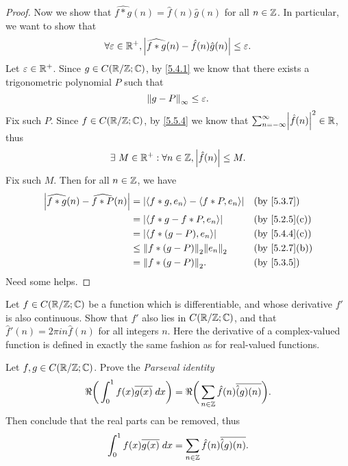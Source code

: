 \begin{proof}
  Now we show that \(\widehat{f * g}(n) = \hat{f}(n) \hat{g}(n)\) for all \(n \in \Z\).
  In particular, we want to show that
  \[
    \forall \varepsilon \in \R^+, \abs{\widehat{f * g}(n) - \hat{f}(n) \hat{g}(n)} \leq \varepsilon.
  \]
  Let \(\varepsilon \in \R^+\).
  Since \(g \in C(\R / \Z ; \C)\), by \cref{5.4.1} we know that there exists a trigonometric polynomial \(P\) such that
  \[
    \norm*{g - P}_{\infty} \leq \varepsilon.
  \]
  Fix such \(P\).
  Since \(f \in C(\R / \Z ; \C)\), by \cref{5.5.4} we know that \(\sum_{n = -\infty}^\infty \abs{\hat{f}(n)}^2 \in \R\), thus
  \[
    \exists\ M \in \R^+ : \forall n \in \Z, \abs{\hat{f}(n)} \leq M.
  \]
  Fix such \(M\).
  Then for all \(n \in \Z\), we have
  \begin{align*}
    \abs{\widehat{f * g}(n) - \widehat{f * P}(n)} & = \abs{\inner*{f * g, e_n} - \inner*{f * P, e_n}} &  & \text{(by \cref{5.3.7})}    \\
                                                  & = \abs{\inner*{f * g - f * P, e_n}}               &  & \text{(by \cref{5.2.5}(c))} \\
                                                  & = \abs{\inner*{f * (g - P), e_n}}                 &  & \text{(by \cref{5.4.4}(c))} \\
                                                  & \leq \norm*{f * (g - P)}_2 \norm*{e_n}_2          &  & \text{(by \cref{5.2.7}(b))} \\
                                                  & = \norm*{f * (g - P)}_2.                          &  & \text{(by \cref{5.3.5})}
  \end{align*}
  Need some helps.
\end{proof}

\begin{ex}\label{ex:5.5.4}
  Let \(f \in C(\R / \Z ; \C)\) be a function which is differentiable, and whose derivative \(f'\) is also continuous.
  Show that \(f'\) also lies in \(C(\R / \Z ; \C)\), and that \(\hat{f}'(n) = 2 \pi i n \hat{f}(n)\) for all integers \(n\).
  Here the derivative of a complex-valued function is defined in exactly the same fashion as for real-valued functions.
\end{ex}

\begin{ex}\label{ex:5.5.5}
  Let \(f, g \in C(\R / \Z ; \C)\).
  Prove the \emph{Parseval identity}
  \[
    \Re\bigg(\int_0^1 f(x) \overline{g(x)} \; dx\bigg) = \Re\bigg(\sum_{n \in \Z} \hat{f}(n) \overline{\hat(g)(n)}\bigg).
  \]
  Then conclude that the real parts can be removed, thus
  \[
    \int_0^1 f(x) \overline{g(x)} \; dx = \sum_{n \in \Z} \hat{f}(n) \overline{\hat(g)(n)}.
  \]
\end{ex}


